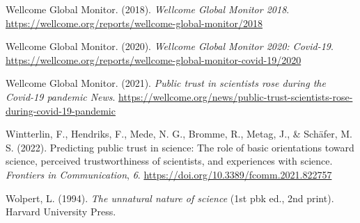 \documentclass[
  jou,
  floatsintext,
  longtable,
  nolmodern,
  notxfonts,
  notimes,
  colorlinks=true,linkcolor=blue,citecolor=blue,urlcolor=blue]{apa7}
\newlength{\cslhangindent}
\newenvironment{CSLReferences}[2] %
 {\begin{list}{}{%
  \setlength{\itemindent}{0pt}
  \setlength{\leftmargin}{0pt}
  \setlength{\parsep}{0pt}
  \ifodd #1
   \setlength{\leftmargin}{\cslhangindent}
   \setlength{\itemindent}{-1\cslhangindent}
  \fi
  \setlength{\itemsep}{#2\baselineskip}}}
 {\end{list}}
\begin{document}
\begin{CSLReferences}{1}{0}
Wellcome Global Monitor. (2018). \emph{Wellcome Global Monitor 2018}.
\url{https://wellcome.org/reports/wellcome-global-monitor/2018}

Wellcome Global Monitor. (2020). \emph{Wellcome Global Monitor 2020:
Covid-19}.
\url{https://wellcome.org/reports/wellcome-global-monitor-covid-19/2020}

Wellcome Global Monitor. (2021). \emph{Public trust in scientists rose
during the Covid-19 pandemic \textbar{} News}.
\url{https://wellcome.org/news/public-trust-scientists-rose-during-covid-19-pandemic}

Wintterlin, F., Hendriks, F., Mede, N. G., Bromme, R., Metag, J., \&
Schäfer, M. S. (2022). Predicting public trust in science: The role of
basic orientations toward science, perceived trustworthiness of
scientists, and experiences with science. \emph{Frontiers in
Communication}, \emph{6}.
\url{https://doi.org/10.3389/fcomm.2021.822757}

Wolpert, L. (1994). \emph{The unnatural nature of science} (1st pbk ed.,
2nd print). Harvard University Press.

\end{CSLReferences}
\end{document}
